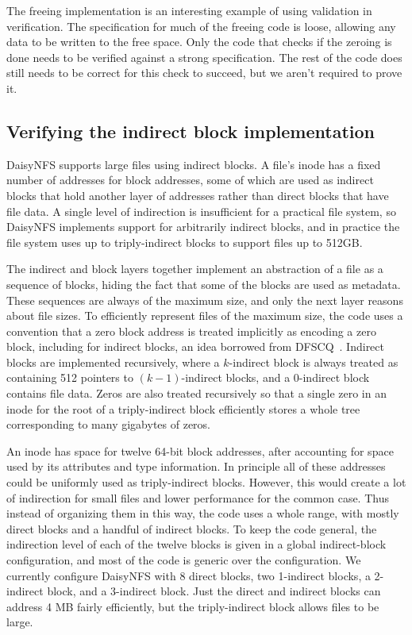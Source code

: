 The freeing implementation is an interesting example of using validation in
verification. The specification for much of the freeing code is loose, allowing
any data to be written to the free space. Only the code that checks if the
zeroing is done needs to be verified against a strong specification. The rest of
the code does still needs to be correct for this check to succeed, but we
aren't required to prove it.

\subsection{Verifying the indirect block implementation}%
\label{sec:dafny:indirect}

DaisyNFS supports large files using indirect blocks. A file's inode has a fixed
number of addresses for block addresses, some of which are used as indirect
blocks that hold another layer of addresses rather than direct blocks that have
file data. A single level of indirection is insufficient for a practical file
system, so DaisyNFS implements support for arbitrarily indirect blocks, and in
practice the file system uses up to triply-indirect blocks to support files up
to 512GB.\@

The indirect and block layers together implement an abstraction of a file as a
sequence of blocks, hiding the fact that some of the blocks are used as
metadata. These sequences are always of the maximum size, and only the next
layer reasons about file sizes. To efficiently represent files of the maximum
size, the code uses a convention that a zero block address is treated implicitly
as encoding a zero block, including for indirect blocks, an idea borrowed from
DFSCQ~\cite{akonradi-meng}. Indirect blocks are implemented recursively, where a
$k$-indirect block is always treated as containing 512 pointers to
$(k-1)$-indirect blocks, and a 0-indirect block contains file data. Zeros are
also treated recursively so that a single zero in an inode for the root of a
triply-indirect block efficiently stores a whole tree corresponding to many
gigabytes of zeros.

An inode has space for twelve 64-bit block addresses, after accounting for space
used by its attributes and type information. In principle all of these addresses
could be uniformly used as triply-indirect blocks. However, this would create a
lot of indirection for small files and lower performance for the common case.
Thus instead of organizing them in this way, the code uses a whole range, with
mostly direct blocks and a handful of indirect blocks. To keep the code general,
the indirection level of each of the twelve blocks is given in a global
indirect-block configuration, and most of the code is generic over the configuration. We currently
configure DaisyNFS with 8 direct blocks, two 1-indirect blocks, a 2-indirect
block, and a 3-indirect block. Just the direct and indirect blocks can address 4
MB fairly efficiently, but the triply-indirect block allows files to be large.

